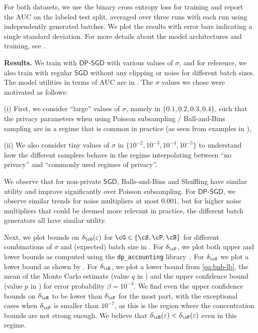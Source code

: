 \documentclass[twoside]{article}
\theoremstyle{definition}
\newcommand{\eps}{\varepsilon}
\newcommand{\BnB}{Balls-and-Bins\xspace}
\newcommand{\SGD}{\mathsf{SGD}}
\newcommand{\DPSGD}{\mathsf{DP}\text{-}\mathsf{SGD}}
\newcommand{\deltaG}{\delta_{\cG}}
\newcommand{\deltaP}{\delta_{\cP}}
\newcommand{\deltaS}{\delta_{\cS}}
\newcommand{\deltaB}{\delta_{\cB}}
\begin{document}
For both datasets, we use the binary cross entropy loss for training and report the AUC on the labeled test split, averaged over three runs with each run using independently generated batches. We plot the results with error bars indicating a single standard deviation. For more details about the model architectures and training, see .

{\bf Results.}
We train with $\DPSGD$ with various values of $\sigma$, and for reference, we also train with regular $\SGD$ without any clipping or noise for different batch sizes. The model utilities in terms of AUC are in .  The $\sigma$ values we chose were motivated as follows:

(i) First, we consider ``large'' values of $\sigma$, namely in $\{0.1, 0.2, 0.3, 0.4\}$, such that the privacy parameters when using Poisson subsampling / Ball-and-Bins sampling are in a regime that is common in practice (as seen from examples in \cite{desfontainesblog2021list}),%

(ii) We also consider tiny values of $\sigma$ in $\{10^{-2}, 10^{-3}, 10^{-4}, 10^{-5}\}$ to understand how the different samplers behave in the regime interpolating between ``no privacy'' and ``commonly used regimes of privacy''.

We observe that for non-private $\SGD$, \BnB and Shuffling have similar utility and improve significantly over Poisson subsampling. For $\DPSGD$, we observe similar trends for noise multipliers at most $0.001$, but for higher noise multipliers that could be deemed more relevant in practice, the different batch generators all have similar utility.

Next, we plot bounds on $\deltaG(\eps)$ for $\cG \in \{\cS, \cP, \cB\}$ for different combinations of $\sigma$ and (expected) batch size in .
For $\deltaP$, we plot both upper and lower bounds as computed using the \texttt{dp\_accounting} library~\citep{GoogleDP}. For $\deltaS$ we plot a lower bound as shown by \cite{chua24private}. For $\deltaB$, we plot a lower bound from \eqref{eq:bnb-lb}, the mean of the Monte Carlo estimate (value $q$ in ) and the upper confidence bound (value $p$ in ) for error probability $\beta = 10^{-3}$. We find even the upper confidence bounds on $\deltaB$ to be lower than $\deltaP$ for the most part, with the exceptional cases when $\deltaP$ is smaller than $10^{-7}$, as this is the region where the concentration bounds are not strong enough. We believe that $\deltaB(\eps) < \deltaP(\eps)$ even in this regime.
\end{document}
